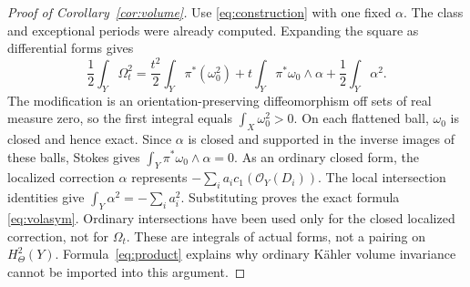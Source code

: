 \documentclass[12pt]{amsart}
\theoremstyle{definition}
\theoremstyle{remark}
\numberwithin{equation}{section}
\newcommand{\cO}{\mathcal{O}}
\begin{document}
\begin{proof}[Proof of Corollary~\ref{cor:volume}]
Use \eqref{eq:construction} with one fixed $\alpha$. The class and exceptional periods were already computed. Expanding the square as differential forms gives
\begin{equation}\label{eq:volume}
 \frac12\int_Y\Omega_t^2
 =\frac{t^2}{2}\int_Y\pi^*(\omega_0^2)
 +t\int_Y\pi^*\omega_0\wedge\alpha+\frac12\int_Y\alpha^2.
\end{equation}
The modification is an orientation-preserving diffeomorphism off sets of real measure zero, so the first integral equals $\int_X\omega_0^2>0$. On each flattened ball, $\omega_0$ is closed and hence exact. Since $\alpha$ is closed and supported in the inverse images of these balls, Stokes gives $\int_Y\pi^*\omega_0\wedge\alpha=0$. As an ordinary closed form, the localized correction $\alpha$ represents $-\sum_i a_ic_1(\cO_Y(D_i))$. The local intersection identities give $\int_Y\alpha^2=-\sum_i a_i^2$. Substituting proves the exact formula \eqref{eq:volasym}. Ordinary intersections have been used only for the closed localized correction, not for $\Omega_t$. These are integrals of actual forms, not a pairing on $H^2_\Theta(Y)$. Formula~\eqref{eq:product} explains why ordinary K\"ahler volume invariance cannot be imported into this argument.
\end{proof}
\end{document}
